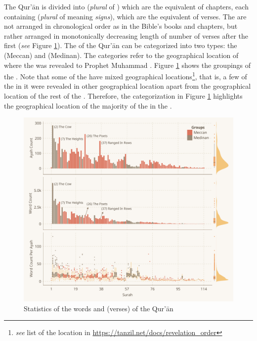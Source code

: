 The Qur'\=an is divided into   (\textit{plural} of  ) which are the equivalent of chapters, each containing   (\textit{plural} of   meaning \textit{signs}), which are the equivalent of verses. The   are not arranged in chronological order as in the Bible's books and chapters, but rather arranged in monotonically decreasing length of number of verses after the first   (\textit{see} Figure \ref{fig:ayah_word_count}). The   of the Qur'\=an can be categorized into two types: the   (Meccan) and   (Medinan). The categories refer to the geographical location of where the   was revealed to Prophet Muhammad . Figure \ref{fig:ayah_word_count} shows the groupings of the  . Note that some of the   have mixed geographical locations\footnote{\textit{see} list of the location in \url{https://tanzil.net/docs/revelation_order}}, that is, a few of the   in it were revealed in other geographical location apart from the geographical location of the rest of the  . Therefore, the categorization in Figure \ref{fig:ayah_word_count} highlights the geographical location of the majority of the   in the  .

\begin{figure}[!b]
    \centering
    \includegraphics[width=\textwidth]{img/plot1.pdf}
    \caption{Statistics of the words and   (verses) of the Qur'\=an}
    \label{fig:ayah_word_count}
\end{figure}

